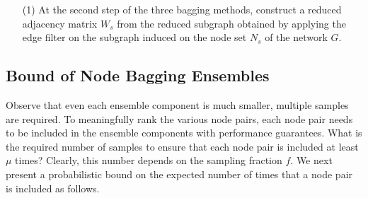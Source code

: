 


\begin{enumerate}
\item[(1)]
At the second step of the three bagging methods, construct a reduced adjacency matrix $W_s$
from the reduced subgraph obtained by applying the edge filter
on the subgraph induced on the node set $N_s$ of the network $G$.

\end{enumerate}
\vspace{-1ex}


\subsection{Bound of Node Bagging Ensembles}

Observe that even each ensemble component is much smaller,
multiple samples are required. To meaningfully rank the various node
pairs, each node pair needs to be included in the ensemble components with performance guarantees.
What is the required number of samples to
ensure that each node pair is included  at least $\mu$ times? Clearly,
this number depends on the sampling fraction $f$. We next present a
probabilistic bound on the expected number of times that a node pair is included as follows.

